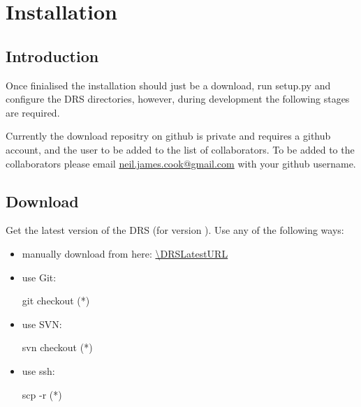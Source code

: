 \chapter{Installation}
\label{chapter:installation}

\section{Introduction}
\label{ch:install:installintro}

Once finialised the installation should just be a download, run setup.py and configure the DRS directories, however, during development the following stages are required.

\begin{note}
Currently the download repositry on github is private and requires a github account, and the user to be added to the list of collaborators. To be added to the collaborators please email \url{neil.james.cook@gmail.com} with your github username.
\end{note}







\section{Download}
\label{ch:install:installDownload}

Get the latest version of the DRS (for \instrument version \MyCodeVersion). Use any of the following ways:

\begin{itemize}
\item manually download from here: \url{\DRSLatestURL}

\item use Git:
\begin{cmdbox}
git checkout (*\DRSGitURL*)
\end{cmdbox}

\item use SVN:
\begin{cmdbox}
svn checkout  (*\DRSGitURL*)
\end{cmdbox}

\item use ssh:
\begin{cmdbox}
scp -r (*\DRSsshURL*)
\end{cmdbox}

\end{itemize}


